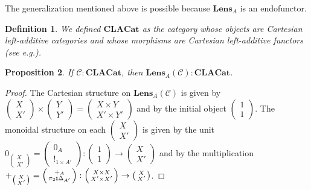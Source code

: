 \documentclass[11pt,a4paper,openright,twoside]{report}
\theoremstyle{plain}
\newtheorem{proposition}{Proposition}
\newtheorem{definition}[proposition]{Definition}
\theoremstyle{definition}
\begin{document}
The generalization mentioned above is possible because $\mathbf{Lens}_A$ is an endofunctor.

\begin{definition}
  We defined $\mathbf{CLACat}$ as the category whose objects are Cartesian left-additive categories and whose morphisms are Cartesian left-additive functors (see e.g.\cite{blute2006differential}).
\end{definition}

\begin{proposition}
  If $\mathcal{C} : \mathbf{CLACat}$, then $\mathbf{Lens}_A(\mathcal{C}) : \mathbf{CLACat}$.
\end{proposition}
\begin{proof}
  The Cartesian structure on $\mathbf{Lens}_A(\mathcal{C})$ is given by $\left(\begin{smallmatrix}X \\ X'\end{smallmatrix}\right) \times \left(\begin{smallmatrix}Y \\ Y'\end{smallmatrix}\right) = \left(\begin{smallmatrix}X\times Y \\ X' \times Y'\end{smallmatrix}\right)$ and by the initial object $\left(\begin{smallmatrix}1 \\ 1\end{smallmatrix}\right)$. The monoidal structure on each $\left(\begin{smallmatrix}X \\ X'\end{smallmatrix}\right)$ is given by the unit $0_{\left(\begin{smallmatrix}X \\ X'\end{smallmatrix}\right)} = \left(\begin{smallmatrix}0_A \\ !_{1 \times A'}\end{smallmatrix}\right): \left(\begin{smallmatrix}1 \\ 1\end{smallmatrix}\right) \to \left(\begin{smallmatrix}X \\ X'\end{smallmatrix}\right)$ and by the multiplication $+_{\left(\begin{smallmatrix}X \\ X'\end{smallmatrix}\right)} = \left(\begin{smallmatrix}+_A \\ \pi_2 \fatsemi \Delta_{A'}\end{smallmatrix}\right): \left(\begin{smallmatrix}X \times X \\ X' \times X'\end{smallmatrix}\right) \to \left(\begin{smallmatrix}X \\ X'\end{smallmatrix}\right)$.

\end{proof}
\end{document}
